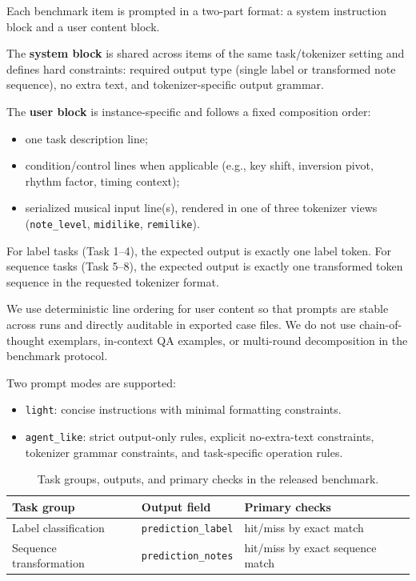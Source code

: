 \documentclass{article}
\begin{document}
Each benchmark item is prompted in a two-part format: a system instruction block and a user content block.

The \textbf{system block} is shared across items of the same task/tokenizer setting and defines hard constraints: required output type (single label or transformed note sequence), no extra text, and tokenizer-specific output grammar.

The \textbf{user block} is instance-specific and follows a fixed composition order:
\begin{itemize}
    \item one task description line;
    \item condition/control lines when applicable (e.g., key shift, inversion pivot, rhythm factor, timing context);
    \item serialized musical input line(s), rendered in one of three tokenizer views (\texttt{note\_level}, \texttt{midilike}, \texttt{remilike}).
\end{itemize}

For label tasks (Task 1--4), the expected output is exactly one label token. For sequence tasks (Task 5--8), the expected output is exactly one transformed token sequence in the requested tokenizer format.

We use deterministic line ordering for user content so that prompts are stable across runs and directly auditable in exported case files. We do not use chain-of-thought exemplars, in-context QA examples, or multi-round decomposition in the benchmark protocol.

Two prompt modes are supported:
\begin{itemize}
    \item \texttt{light}: concise instructions with minimal formatting constraints.
    \item \texttt{agent\_like}: strict output-only rules, explicit no-extra-text constraints, tokenizer grammar constraints, and task-specific operation rules.
\end{itemize}

\begin{table}[t]
  \centering
  \caption{Task groups, outputs, and primary checks in the released benchmark.}
  \label{tab:tasks}
  \small
  \setlength{\tabcolsep}{4pt}
  \renewcommand{\arraystretch}{1.08}
  \begin{tabular}{@{}>{\raggedright\arraybackslash}p{}>{\raggedright\arraybackslash}p{}>{\raggedright\arraybackslash}p{}@{}}
    \toprule
    Task group & Output field & Primary checks \\
    \midrule
    Label classification & \texttt{prediction\_label} & hit/miss by exact match \\
    Sequence transformation & \texttt{prediction\_notes} & hit/miss by exact sequence match \\
    \bottomrule
  \end{tabular}
\end{table}
\end{document}
